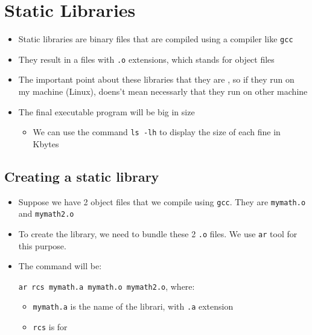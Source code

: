 \documentclass[12pt,a4paper]{book}
\begin{document}
\section{Static Libraries}

\begin{itemize}

\item Static libraries are binary files that are compiled using a compiler like \verb|gcc|

\item They result in a files with \verb|.o| extensions, which stands for object files

\item The important point about these libraries that they are , so if they run on my machine (Linux), doens't mean necessarly that they run on other machine

\item The final executable program will be big in size

	\begin{itemize}
	\item We can use the command \verb|ls -lh| to display the size of each fine in Kbytes
	\end{itemize}


\end{itemize}

\subsection{Creating a static library}

\begin{itemize}

\item Suppose we have 2 object files that we compile using \verb|gcc|. They are \verb|mymath.o| and \verb|mymath2.o|

\item To create the library, we need to bundle these 2 \verb|.o| files. We use \verb|ar| tool for this purpose.

\item The command will be:

\verb|ar rcs mymath.a mymath.o mymath2.o|, where:

	\begin{itemize}
	\item \verb|mymath.a| is the name of the librari, with \verb|.a| extension
	
	\item \verb|rcs| is for 
	\end{itemize}


\end{itemize}
\end{document}
